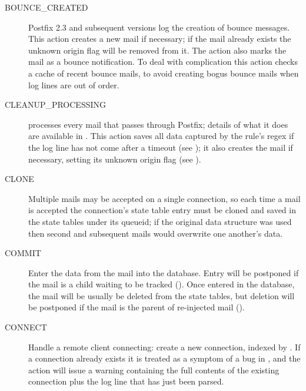 \begin{description}

    \item [BOUNCE\_CREATED] Postfix 2.3 and subsequent versions log the
        creation of bounce messages.  This action creates a new mail if
        necessary; if the mail already exists the unknown origin flag will
        be removed from it.  The action also marks the mail as a bounce
        notification.  To deal with complication  this
        action checks a cache of recent bounce mails, to avoid creating
        bogus bounce mails when log lines are out of order.

    \item [CLEANUP\_PROCESSING]  processes every mail that
        passes through Postfix; details of what it does are available in
        .  This action saves all data captured
        by the rule's regex if the log line has not come after a timeout
        (see ); it also creates
        the mail if necessary, setting its unknown origin flag (see
        ).

    \item [CLONE] Multiple mails may be accepted on a single connection, so
        each time a mail is accepted the connection's state table entry
        must be cloned and saved in the state tables under its queueid; if
        the original data structure was used then second and subsequent
        mails would overwrite one another's data.

    \item [COMMIT] Enter the data from the mail into the database.  Entry
        will be postponed if the mail is a child waiting to be tracked
        ().  Once entered in the database,
        the mail will be usually be deleted from the state tables, but
        deletion will be postponed if the mail is the parent of re-injected
        mail ().

    \item [CONNECT] Handle a remote client connecting: create a new
        connection, indexed by  .  If a
        connection already exists it is treated as a symptom of a bug in
        \parsername{}, and the action will issue a warning containing the
        full contents of the existing connection plus the log line that has
        just been parsed.


\end{description}
